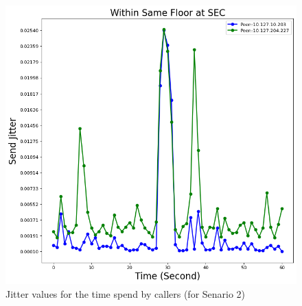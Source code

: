 	\begin{figure}[!t]
		\begin{minipage}{\textwidth}
			\includegraphics[scale=0.38]{Images/experiment/senarios/df_in_floor.png}
		\end{minipage}
		\caption{Jitter values for the time spend by callers (for Senario 2)}
		\label{fig:scene-out-2}
	\end{figure}

